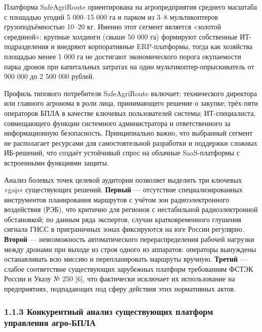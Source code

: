 Платформа SafeAgriRoute ориентирована на агропредприятия среднего масштаба с площадью угодий 5 000--15 000 га и парком из 3--8 мультикоптеров грузоподъёмностью 10--20 кг. Именно этот сегмент является «золотой серединой»: крупные холдинги (свыше 50 000 га) формируют собственные ИТ-подразделения и внедряют корпоративные ERP-платформы, тогда как хозяйства площадью менее 1 000 га не достигают экономического порога окупаемости парка дронов при капитальных затратах на один мультикоптер-опрыскиватель от 900 000 до 2 500 000 рублей.

Профиль типового потребителя SafeAgriRoute включает: технического директора или главного агронома в роли лица, принимающего решение о закупке; трёх-пяти операторов БПЛА в качестве ключевых пользователей системы; ИТ-специалиста, совмещающего функции системного администратора и ответственного за информационную безопасность. Принципиально важно, что выбранный сегмент не располагает ресурсами для самостоятельной разработки и поддержки сложных ИБ-решений, что создаёт устойчивый спрос на облачные SaaS-платформы с встроенными функциями защиты.

Анализ болевых точек целевой аудитории позволяет выделить три ключевых «gap» существующих решений. \textbf{Первый} --- отсутствие специализированных инструментов планирования маршрутов с учётом зон радиоэлектронного воздействия (РЭБ), что критично для регионов с нестабильной радиоэлектронной обстановкой; по данным ряда экспертов, случаи кратковременного глушения сигнала ГНСС в приграничных зонах фиксируются на юге России регулярно. \textbf{Второй} --- невозможность автоматического перераспределения рабочей нагрузки между дронами при выходе из строя одного из аппаратов: операторы вынуждены останавливать всю миссию и перепланировать маршруты вручную. \textbf{Третий} --- слабое соответствие существующих зарубежных платформ требованиям ФСТЭК России и Указу № 250 {[}6{]}, что фактически исключает их использование на предприятиях, подпадающих под сферу действия этих нормативных актов.

\hypertarget{ux43aux43eux43dux43aux443ux440ux435ux43dux442ux43dux44bux439-ux430ux43dux430ux43bux438ux437-ux441ux443ux449ux435ux441ux442ux432ux443ux44eux449ux438ux445-ux43fux43bux430ux442ux444ux43eux440ux43c-ux443ux43fux440ux430ux432ux43bux435ux43dux438ux44f-ux430ux433ux440ux43e-ux431ux43fux43bux430}{%
\subsubsection{1.1.3 Конкурентный анализ существующих платформ управления агро-БПЛА}\label{ux43aux43eux43dux43aux443ux440ux435ux43dux442ux43dux44bux439-ux430ux43dux430ux43bux438ux437-ux441ux443ux449ux435ux441ux442ux432ux443ux44eux449ux438ux445-ux43fux43bux430ux442ux444ux43eux440ux43c-ux443ux43fux440ux430ux432ux43bux435ux43dux438ux44f-ux430ux433ux440ux43e-ux431ux43fux43bux430}}


